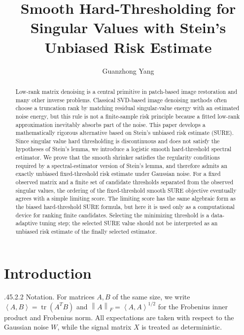 \documentclass[12pt,reqno]{amsart}
\title[Smooth Hard-Thresholding for Singular Values with SURE]{Smooth Hard-Thresholding for Singular Values with Stein\textquoteright{}s Unbiased Risk Estimate}
\author[Guanzhong Yang]{Guanzhong Yang}
\makeatletter
\numberwithin{equation}{section}
\def\paragraph{\@startsection{paragraph}{4}{\z@}%
  {.45\linespacing\@plus.2\linespacing}{.2\linespacing}%
  {\normalfont\bfseries}}
\theoremstyle{plain}
\theoremstyle{definition}
\newcommand{\norm}[1]{\left\lVert #1\right\rVert}
\newcommand{\inner}[2]{\left\langle #1,#2\right\rangle}
\makeatother
\begin{document}
\begin{abstract}
Low-rank matrix denoising is a central primitive in patch-based image restoration and many other inverse problems. Classical SVD-based image denoising methods often choose a truncation rank by matching residual singular-value energy with an estimated noise energy, but this rule is not a finite-sample risk principle because a fitted low-rank approximation inevitably absorbs part of the noise. This paper develops a mathematically rigorous alternative based on Stein's unbiased risk estimate (SURE). Since singular value hard thresholding is discontinuous and does not satisfy the hypotheses of Stein's lemma, we introduce a logistic smooth hard-threshold spectral estimator. We prove that the smooth shrinker satisfies the regularity conditions required by a spectral-estimator version of Stein's lemma, and therefore admits an exactly unbiased fixed-threshold risk estimate under Gaussian noise. For a fixed observed matrix and a finite set of candidate thresholds separated from the observed singular values, the ordering of the fixed-threshold smooth SURE objective eventually agrees with a simple limiting score. The limiting score has the same algebraic form as the biased hard-threshold SURE formula, but here it is used only as a computational device for ranking finite candidates. Selecting the minimizing threshold is a data-adaptive tuning step; the selected SURE value should not be interpreted as an unbiased risk estimate of the finally selected estimator.
\end{abstract}

\maketitle

\section{Introduction}

\paragraph{Notation.}
For matrices $A,B$ of the same size, we write
$\inner{A}{B}=\operatorname{tr}(A^TB)$ and
$\norm{A}_F=\inner{A}{A}^{1/2}$ for the Frobenius inner product and Frobenius norm.
All expectations are taken with respect to the Gaussian noise $W$, while the signal matrix $X$ is treated as deterministic.
\end{document}
